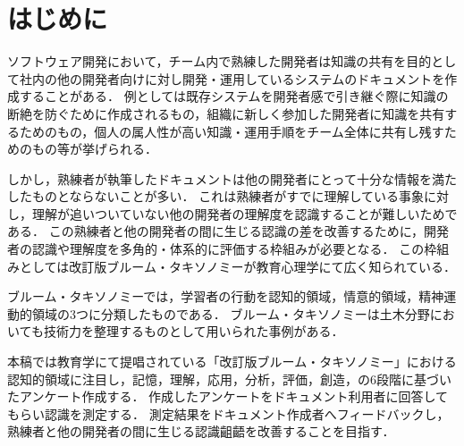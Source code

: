 \section{はじめに}
ソフトウェア開発において，チーム内で熟練した開発者は知識の共有を目的として社内の他の開発者向けに対し開発・運用しているシステムのドキュメントを作成することがある．
例としては既存システムを開発者感で引き継ぐ際に知識の断絶を防ぐために作成されるもの，組織に新しく参加した開発者に知識を共有するためのもの，個人の属人性が高い知識・運用手順をチーム全体に共有し残すためのもの等が挙げられる．

しかし，熟練者が執筆したドキュメントは他の開発者にとって十分な情報を満たしたものとならないことが多い．
これは熟練者がすでに理解している事象に対し，理解が追いついていない他の開発者の理解度を認識することが難しいためである．
この熟練者と他の開発者の間に生じる認識の差を改善するために，開発者の認識や理解度を多角的・体系的に評価する枠組みが必要となる．
この枠組みとしては改訂版ブルーム・タキソノミーが教育心理学にて広く知られている\cite{bib:nakao}．

ブルーム・タキソノミーでは，学習者の行動を認知的領域，情意的領域，精神運動的領域の3つに分類したものである．
ブルーム・タキソノミーは土木分野においても技術力を整理するものとして用いられた事例がある．\cite{bib:miyahara}

本稿では教育学にて提唱されている「改訂版ブルーム・タキソノミー」における認知的領域に注目し，記憶，理解，応用，分析，評価，創造，の6段階に基づいたアンケート作成する．
作成したアンケートをドキュメント利用者に回答してもらい認識を測定する．
測定結果をドキュメント作成者へフィードバックし，熟練者と他の開発者の間に生じる認識齟齬を改善することを目指す．

